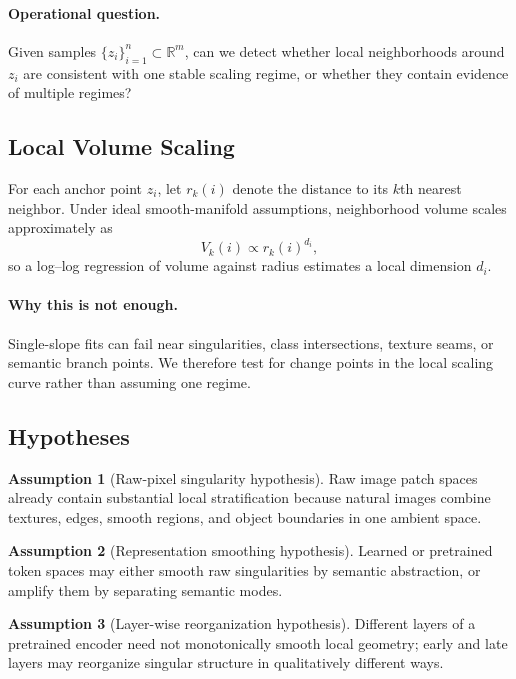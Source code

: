 \documentclass{article}
\newcommand{\R}{\mathbb{R}}
\theoremstyle{definition}
\newtheorem{assumption}{Assumption}
\theoremstyle{plain}
\theoremstyle{remark}
\begin{document}
\paragraph{Operational question.}
Given samples $\{z_i\}_{i=1}^n \subset \R^m$, can we detect whether local neighborhoods around $z_i$ are consistent with one stable scaling regime, or whether they contain evidence of multiple regimes?

\subsection{Local Volume Scaling}
For each anchor point $z_i$, let $r_k(i)$ denote the distance to its $k$th nearest neighbor. Under ideal smooth-manifold assumptions, neighborhood volume scales approximately as
\begin{equation}
  V_k(i) \propto r_k(i)^{d_i},
\end{equation}
so a log--log regression of volume against radius estimates a local dimension $d_i$.

\paragraph{Why this is not enough.}
Single-slope fits can fail near singularities, class intersections, texture seams, or semantic branch points. We therefore test for change points in the local scaling curve rather than assuming one regime.

\subsection{Hypotheses}
\begin{assumption}[Raw-pixel singularity hypothesis]
Raw image patch spaces already contain substantial local stratification because natural images combine textures, edges, smooth regions, and object boundaries in one ambient space.
\end{assumption}

\begin{assumption}[Representation smoothing hypothesis]
Learned or pretrained token spaces may either smooth raw singularities by semantic abstraction, or amplify them by separating semantic modes.
\end{assumption}

\begin{assumption}[Layer-wise reorganization hypothesis]
Different layers of a pretrained encoder need not monotonically smooth local geometry; early and late layers may reorganize singular structure in qualitatively different ways.
\end{assumption}
\end{document}
